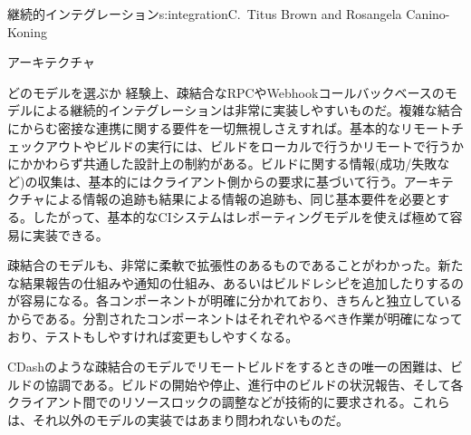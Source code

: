 \begin{aosachapter}{継続的インテグレーション}{s:integration}{C.\ Titus Brown and Rosangela Canino-Koning}
\begin{aosasect1}{アーキテクチャ}
\begin{aosasect2}{どのモデルを選ぶか}
経験上、疎結合なRPCやWebhookコールバックベースのモデルによる継続的インテグレーションは非常に実装しやすいものだ。複雑な結合にからむ密接な連携に関する要件を一切無視しさえすれば。基本的なリモートチェックアウトやビルドの実行には、ビルドをローカルで行うかリモートで行うかにかかわらず共通した設計上の制約がある。ビルドに関する情報(成功/失敗など)の収集は、基本的にはクライアント側からの要求に基づいて行う。アーキテクチャによる情報の追跡も結果による情報の追跡も、同じ基本要件を必要とする。したがって、基本的なCIシステムはレポーティングモデルを使えば極めて容易に実装できる。

疎結合のモデルも、非常に柔軟で拡張性のあるものであることがわかった。新たな結果報告の仕組みや通知の仕組み、あるいはビルドレシピを追加したりするのが容易になる。各コンポーネントが明確に分かれており、きちんと独立しているからである。分割されたコンポーネントはそれぞれやるべき作業が明確になっており、テストもしやすければ変更もしやすくなる。

CDashのような疎結合のモデルでリモートビルドをするときの唯一の困難は、ビルドの協調である。ビルドの開始や停止、進行中のビルドの状況報告、そして各クライアント間でのリソースロックの調整などが技術的に要求される。これらは、それ以外のモデルの実装ではあまり問われないものだ。


\end{aosasect2}
\end{aosasect1}
\end{aosachapter}
